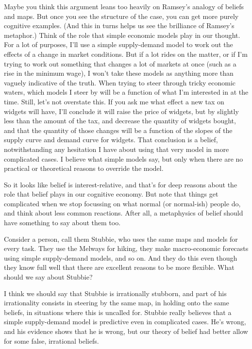 \documentclass[11pt,]{book}
\begin{document}
Maybe you think this argument leans too heavily on Ramsey's analogy of beliefs and maps. But once you see the structure of the case, you can get more purely cognitive examples. (And this in turns helps us see the brilliance of Ramsey's metaphor.) Think of the role that simple economic models play in our thought. For a lot of purposes, I'll use a simple supply-demand model to work out the effects of a change in market conditions. But if a lot rides on the matter, or if I'm trying to work out something that changes a lot of markets at once (such as a rise in the minimum wage), I won't take these models as anything more than vaguely indicative of the truth. When trying to steer through tricky economic waters, which models I steer by will be a function of what I'm interested in at the time. Still, let's not overstate this. If you ask me what effect a new tax on widgets will have, I'll conclude it will raise the price of widgets, but by slightly less than the amount of the tax, and decrease the quantity of widgets bought, and that the quantity of those changes will be a function of the slopes of the supply curve and demand curve for widgets. That conclusion is a belief, notwithstanding any hesitation I have about using that very model in more complicated cases. I believe what simple models say, but only when there are no practical or theoretical reasons to override the model.

So it looks like belief is interest-relative, and that's for deep reasons about the role that belief plays in our cognitive economy. But note that things get complicated when we stop focussing on what normal (or normal-ish) people do, and think about less common reactions. After all, a metaphysics of belief should have something to say about them too.

Consider a person, call them Stubbie, who uses the same maps and models for every task. They use the Melways for hiking, they make macro-economic forecasts using simple supply-demand models, and so on. And they do this even though they know full well that there are excellent reasons to be more flexible. What should we say about Stubbie?

I think we should say that Stubbie is irrationally stubborn, and part of his irrationality consists in steering by the same map, in holding onto the same beliefs, in situations where this is uncalled for. Stubbie really believes that a simple supply-demand model is predictive even in complicated cases. He's wrong, and his evidence shows that he is wrong, but our theory of belief had better allow for some false, irrational beliefs.
\end{document}
